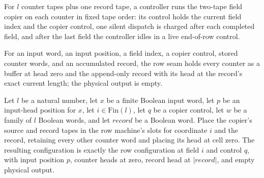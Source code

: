 \begin{definition}
\label{Complexity.clRowTM}
\leanok
{}
For $l$ counter tapes plus one record tape, a controller runs the two-tape field copier on each counter in fixed tape order: its control holds the current field index and the copier control, one silent dispatch is charged after each completed field, and after the last field the controller idles in a live end-of-row control.
\end{definition}

\begin{definition}
\label{Complexity.clRowCfg}
\leanok
{}
For an input word, an input position, a field index, a copier control, stored counter words, and an accumulated record, the row seam holds every counter as a buffer at head zero and the append-only record with its head at the record's exact current length; the physical output is empty.
\end{definition}

\begin{lemma}
\label{Complexity.clRow_frame}
\leanok
{}
Let $l$ be a natural number, let $x$ be a finite Boolean input word, let $p$ be an
input-head position for $x$, let $i\in\mathrm{Fin}(l)$, let $q$ be a copier control, let
$w$ be a family of $l$ Boolean words, and let $record$ be a Boolean word. Place the
copier's source and record tapes in the row machine's slots for coordinate $i$ and the
record, retaining every other counter word and placing its head at cell zero. The
resulting configuration is exactly the row configuration at field $i$ and control $q$,
with input position $p$, counter heads at zero, record head at $|record|$, and empty
physical output.
\end{lemma}

